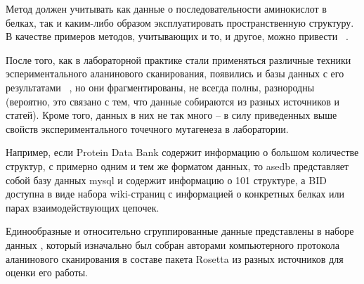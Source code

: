 Метод должен учитывать как данные о последовательности аминокислот в белках, так и каким-либо образом эксплуатировать пространственную структуру. В качестве примеров методов, учитывающих и то, и другое, можно привести ~\cite{svm1, svm2, hmmsvm}.



После того, как в лабораторной практике стали применяться различные техники эспериментального аланинового сканирования, появились и базы данных с его результатами ~\cite{asedb2001, bid2003}, но они фрагментированы, не всегда полны, разнородны (вероятно, это связано с тем, что данные собираются из разных источников и статей). Кроме того, данных в них не так много -- в силу приведенных выше свойств экспериментального точечного мутагенеза в лаборатории.

Например, если Protein Data Bank содержит информацию о большом количестве структур, с примерно одним и тем же форматом данных, то asedb представляет собой базу данных mysql и содержит информацию о 101 структуре, а BID доступна в виде набора wiki-страниц с информацией о конкретных белках или парах взаимодействующих цепочек.

Единообразные и относительно сгруппированные данные представлены в наборе данных  \cite{kortemme_alascan_datasets}, который изначально был собран авторами компьютерного протокола аланинового сканирования в составе пакета Rosetta \cite{kortemme2002, kortemme2004} из разных источников для оценки его работы.